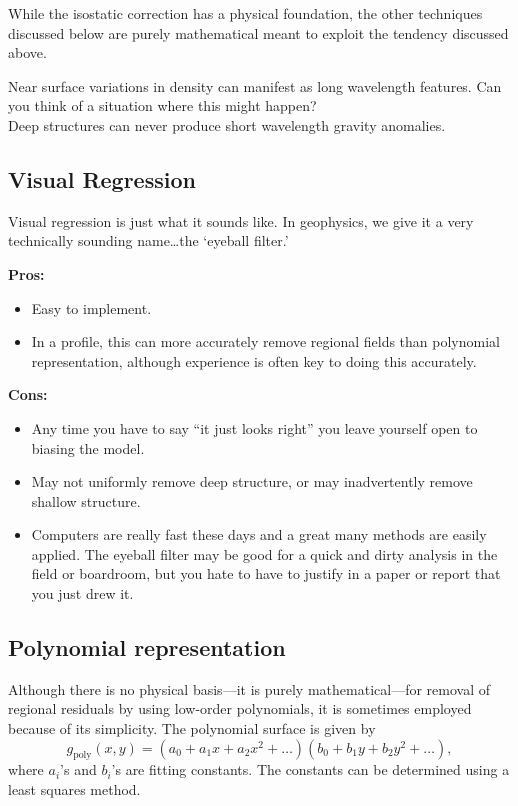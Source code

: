 While the isostatic correction has a physical foundation, the other techniques discussed below are purely mathematical meant to exploit the tendency discussed above.

\begin{framed}
 Near surface variations in density can manifest as long wavelength features.  Can you think of a situation where this might happen?  \\

\noindent Deep structures can never produce short wavelength gravity anomalies.
\end{framed}

\subsection{Visual Regression}
Visual regression is just what it sounds like.  In geophysics, we give it a very technically sounding name\ldots the `eyeball filter.'

{\bf Pros:}
\begin{itemize}
    \item Easy to implement.
    \item In a profile, this can more accurately remove regional fields than polynomial representation, although experience is often key to doing this accurately.
\end{itemize}
{\bf Cons:}
\begin{itemize}
    \item Any time you have to say ``it just looks right'' you leave yourself open to biasing the model.
    \item May not uniformly remove deep structure, or may inadvertently remove shallow structure.
    \item Computers are really fast these days and a great many methods are
    easily applied.  The eyeball filter may be good for a quick and dirty analysis in the field or boardroom, but you hate to have to justify in a paper or report that you just drew it.
\end{itemize}

\subsection{Polynomial representation}
Although there is no physical basis---it is purely mathematical---for removal of regional residuals by using low-order polynomials, it is sometimes employed because of its simplicity.  The polynomial surface is given by
\begin{equation}
    g_{\mathrm{poly}}(x,y) = \left( a_{0} + a_{1} x + a_{2} x^2 + \ldots \right)
    \left( b_{0} + b_{1} y + b_{2} y^2 + \ldots \right),
\end{equation}
where $a_{i}$'s and $b_{i}$'s are fitting constants.  The constants can be
determined using a least squares method.

